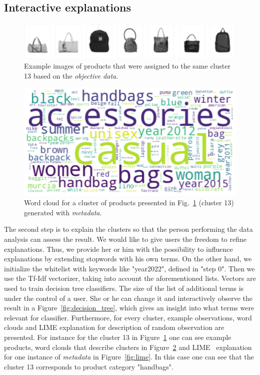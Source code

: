 \documentclass{article}
\begin{document}
\subsection{Interactive explanations}\label{subsec:interactive-explanations}
\begin{figure}[h!]
    \centering
    \includegraphics[width=\linewidth]{example1-clustering-products-fashion-tex/output_62_22}
    \caption{Example images of products that were assigned to the same cluster 13 based on the \textit{objective data}.}
    \label{fig:example_products}
\end{figure}

\begin{figure}[h!]
    \centering
    \includegraphics[width=\linewidth]{example1-clustering-products-fashion-tex/output_62_23}
    \caption{Word cloud for a cluster of products presented in Fig.~\ref{fig:example_products} (cluster 13) generated with \textit{metadata}.}
    \label{fig:wordcloud}
\end{figure}

The second step is to explain the clusters so that the person performing the data analysis can assess the result.
We would like to give users the freedom to refine explanations.
Thus, we provide her or him with the possibility to influence explanations by extending stopwords with his own terms.
On the other hand, we initialize the whitelist with keywords like "year2022", defined in "step 0".
Then we use the Tf-Idf vectorizer, taking into account the aforementioned lists.
Vectors are used to train decision tree classifiers.
The size of the list of additional terms is under the control of a user.
She or he can change it and interactively observe the result in a Figure~\ref{fig:decision_tree}, which gives an insight into what terms were relevant for classifier.
Furthermore, for every cluster, example observations, word clouds and LIME explanation for description of random observation are presented.
For instance for the cluster 13 in Figure~\ref{fig:example_products} one can see example products, word clouds that describe clusters in Figure~\ref{fig:wordcloud} and LIME~\cite{lime} explanation for one instance of \textit{metadata} in Figure~\ref{fig:lime}.
In this case one can see that the cluster 13 corresponds to product category "handbags".
\end{document}
